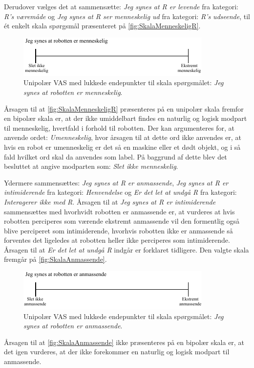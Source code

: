 Derudover vælges det at sammensætte: \textit{Jeg synes at R er levende} fra kategori: \textit{R's væremåde} og \textit{Jeg synes at R ser menneskelig ud} fra kategori: \textit{R's udseende}, til ét enkelt skala spørgsmål præsenteret på \autoref{fig:SkalaMenneskeligR}.
%
\begin{figure}[H]
\centering
\includegraphics[width =\textwidth]{Figure/UdvalgteSkalaer/MenneskeligR} 
\caption{Unipolær VAS med lukkede endepunkter til skala spørgsmålet: \textit{Jeg synes at robotten er menneskelig}.}
\label{fig:SkalaMenneskeligR}
\end{figure}
\noindent
%
Årsagen til at \autoref{fig:SkalaMenneskeligR} præsenteres på en unipolær skala fremfor en bipolær skala er, at der ikke umiddelbart findes en naturlig og logisk modpart til menneskelig, hvertfald i forhold til robotten. Der kan argumenteres for, at anvende ordet: \textit{Umenneskelig}, hvor årsagen til at dette ord ikke anvendes er, at hvis en robot er umenneskelig er det så en maskine eller et dødt objekt, og i så fald hvilket ord skal da anvendes som label. På baggrund af dette blev det besluttet at angive modparten som: \textit{Slet ikke menneskelig}.

Ydermere sammensættes: \textit{Jeg synes at R er anmassende}, \textit{Jeg synes at R er intimiderende} fra kategori: \textit{Henvendelse} og \textit{Er det let at undgå R} fra kategori: \textit{Interagerer ikke med R}. Årsagen til at \textit{Jeg synes at R er intimiderende} sammensættes med hvorhvidt robotten er anmassende er, at vurderes at hvis robotten perciperes som værende ekstremt anmassende vil den formentlig også blive perciperet som intimiderende, hvorhvis robotten ikke er anmassende så forventes det ligeledes at robotten heller ikke perciperes som intimiderende. Årsagen til at \textit{Er det let at undgå R} indgår er forklaret tidligere. Den valgte skala fremgår på \autoref{fig:SkalaAnmassende}.  
%
\begin{figure}[H]
\centering
\includegraphics[width =\textwidth]{Figure/UdvalgteSkalaer/Anmassende} 
\caption{Unipolær VAS med lukkede endepunkter til skala spørgsmålet: \textit{Jeg synes at robotten er anmassende}.}
\label{fig:SkalaAnmassende}
\end{figure}
\noindent
%
Årsagen til at \autoref{fig:SkalaAnmassende} ikke præsenteres på en bipolær skala er, at det igen vurderes, at der ikke forekommer en naturlig og logisk modpart til anmassende.  



